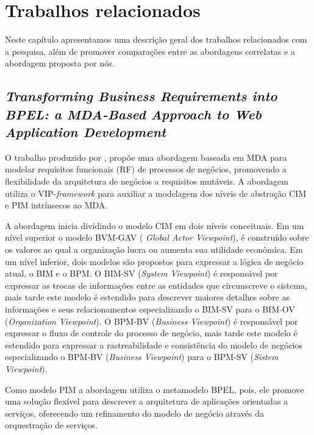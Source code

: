 \chapter{Trabalhos relacionados}
\label{relatedWorks}

Neste capítulo apresentamos uma descrição geral dos trabalhos relacionados com a pesquisa, além de promover comparações entre as abordagens correlatas e a abordagem proposta por nós.

\section{\textit{Transforming Business Requirements into BPEL: a MDA-Based Approach to Web Application Development}}

O trabalho produzido por \cite{Zhang:2008}, propõe uma abordagem baseada em MDA para modelar requisitos funcionais (RF) de processos de negócios, promovendo a flexibilidade da arquitetura de negócios a requisitos mutáveis. A abordagem utiliza o VIP-\textit{framework} para auxiliar a modelagem dos níveis de abstração CIM e PIM intrínsecos ao MDA. 

A abordagem inicia dividindo o modelo CIM em dois níveis conceituais. Em um nível superior o modelo BVM-GAV ( \textit{Global Actor Viewpoint}), é construído sobre os valores ao qual a organização lucra ou aumenta sua utilidade econômica. Em um nível inferior, dois modelos são propostos para expressar a lógica de negócio atual, o BIM e o BPM. O BIM-SV (\textit{System Viewpoint}) é responsável por expressar as trocas de informações entre as entidades que circunscreve o sistema, mais tarde este modelo é estendido para descrever maiores detalhes sobre as informações e seus relacionamentos especializando o BIM-SV para o BIM-OV (\textit{Organization Viewpoint}). O BPM-BV (\textit{Business Viewpoint}) é responsável por expressar o fluxo de controle do processo de negócio, mais tarde este modelo é estendido para expressar a rastreabilidade e consistência do modelo de negócios especializando o BPM-BV (\textit{Business Viewpoint}) para o BPM-SV (\textit{Sistem Viewpoint}). 

Como modelo PIM a abordagem utiliza o metamodelo BPEL, pois, ele promove uma solução flexível para descrever a arquitetura de aplicações orientadas a serviços, oferecendo um refinamento do modelo de negócio através da orquestração de serviços.

